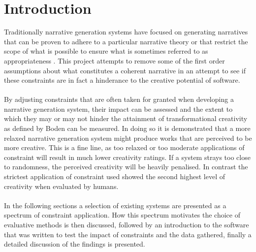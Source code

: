 \documentclass[letterpaper]{article}
\begin{document}
\section{Introduction}
Traditionally narrative generation systems have focused on generating narratives that can be proven to adhere to a particular narrative theory \cite{Perez2015}  or that restrict the scope of what is possible \cite{leon2008creative} to ensure what is sometimes referred to as appropriateness \cite{Sharples96anaccount}. This project attempts to remove some of the first order assumptions about what constitutes a coherent narrative in an attempt to see if these constraints are in fact a hinderance to the creative potential of software.\\ 
\\By adjusting constraints that are often taken for granted when developing a narrative generation system, their impact can be assessed and the extent to which they may or may not hinder the attainment of transformational creativity as defined by Boden \cite{BODEN1998347} can be measured. In doing so it is demonstrated that a more relaxed narrative generation system might produce works that are perceived to be more creative. This is a fine line, as too relaxed or too moderate applications of constraint will result in much lower creativity ratings. If a system strays too close to randomness, the perceived creativity will be heavily penalised. In contrast the strictest application of constraint used showed the second highest level of creativity when evaluated by humans. \\
\\In the following sections a selection of existing systems are presented as a spectrum of constraint application. How this spectrum motivates the choice of evaluative methods is then discussed, followed by an introduction to the software that was written to test the impact of constraints and the data gathered, finally a detailed discussion of the findings is presented.

\end{document}
